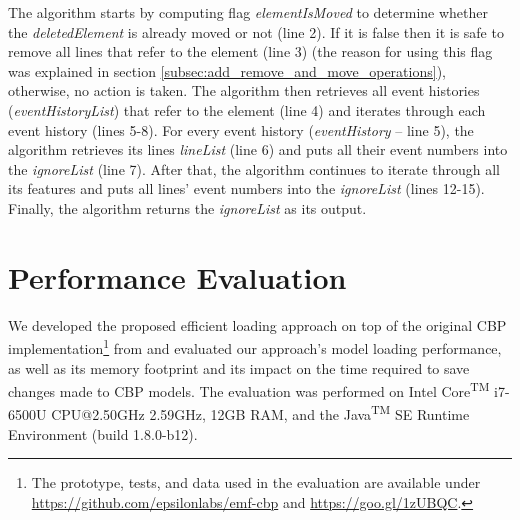 \documentclass{llncs}
\begin{document}
    The algorithm starts by computing flag \emph{elementIsMoved} to determine whether the \emph{deletedElement} is already moved or not (line 2).
    If it is false then it is safe to remove all lines that refer to the element (line 3) (the reason for using this flag was explained in section \ref{subsec:add_remove_and_move_operations}), otherwise, no action is taken.
    The algorithm then retrieves all event histories (\emph{eventHistoryList}) that refer to the element (line 4) and iterates through each event history (lines 5-8).
    For every event history (\emph{eventHistory} -- line 5), the algorithm retrieves its lines \emph{lineList} (line 6) and puts all their event numbers into the \emph{ignoreList} (line 7).
    After that, the algorithm continues to iterate through all its features and puts all lines' event numbers into the \emph{ignoreList} (lines 12-15). Finally, the algorithm returns the \emph{ignoreList} as its output.
    
    

   
    
   
    
    
    \section{Performance Evaluation}
    \label{sec:performance_evaluation}
    
    We developed the proposed efficient loading approach on top of the original CBP implementation\footnote{The prototype, tests, and data used in the evaluation are available under \url{https://github.com/epsilonlabs/emf-cbp} and \url{https://goo.gl/1zUBQC}.} from \cite{yohannis2017turning} and evaluated our approach's model loading performance, as well as its memory footprint and its impact on the time required to save changes made to CBP models. The evaluation was performed on Intel\textsuperscript{\textregistered} Core\textsuperscript{TM} i7-6500U CPU@2.50GHz 2.59GHz, 12GB RAM, and the Java\textsuperscript{TM} SE Runtime Environment (build 1.8.0-b12).
    
\end{document}

